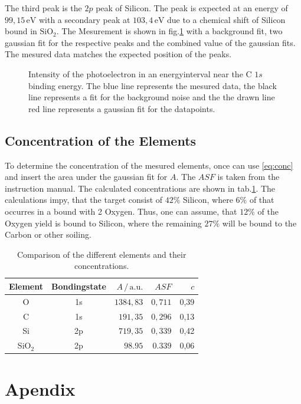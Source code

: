 \documentclass[numbers=noenddot,a4paper]{article}
\begin{document}
The third peak is the $2p$ peak of Silicon. The peak is expected at an energy of $99,15\,\mathrm{eV}$ with a secondary peak at $103,4\,\mathrm{eV}$ due to a chemical shift of Silicon bound in $\text{SiO}_2$. The Mesurement is shown in fig.\ref{fig:Si2p} with a background fit, two gaussian fit for the respective peaks and the combined value of the gaussian fits. The mesured data matches the expected position of the peaks.

\begin{figure}[!H]
	\centering
	\caption{Intensity of the photoelectron in an energyinterval near the C $1s$ binding energy. The blue line represents the mesured data, the black line represents a fit for the background noise and the  the drawn line red line represents a gaussian fit for the datapoints.}
	\label{fig:Si2p}
\end{figure}



\subsection{Concentration of the Elements}

To determine the concentration of the mesured elements, once can use \eqref{eq:conc} and insert the area under the gaussian fit for $A$. The $ASF$ is taken from the instruction manual. The calculated concentrations are shown in tab.\ref{tab:conc}. The calculations impy, that the target consist of $42\%$ Silicon, where $6\%$ of that occurres in a bound with 2 Oxygen. Thus, one can assume, that $12\%$ of the Oxygen yield is bound to Silicon, where the remaining $27\%$ will be bound to the Carbon or other soiling.

\begin{table}[h]
	\centering
	\caption{Comparison of the different elements and their concentrations.}
	\begin{tabular}{c c r r r}
		\hline Element & Bondingstate & $A\,/\,\mathrm{a.u.}$ & $ASF$ & $c$ \\ \hline \hline
		O & 1s & $1384,83$ & $0,711$ & 0,39 \\ 
		C & 1s & $191,35$ & $0,296$ & 0,13 \\ 
		Si & 2p & $719,35$ & $0,339$ & 0,42 \\ 
		SiO$_2$ & 2p & $98.95$ & $0.339$ & 0,06 \\ \hline
	\end{tabular}
	\label{tab:conc}
\end{table}

	\clearpage
	\section{Apendix}

		
		
\end{document}
